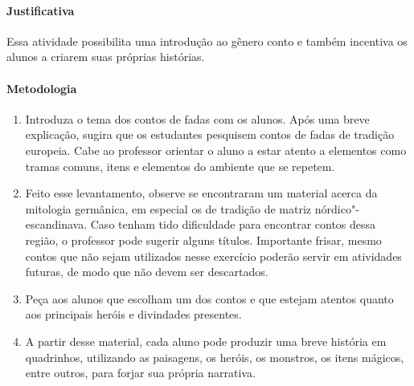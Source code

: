 \documentclass[12pt]{extarticle}
\begin{document}
\paragraph{Justificativa} Essa atividade possibilita uma introdução ao gênero conto e também incentiva os alunos a criarem suas próprias histórias.

\paragraph{Metodologia}

\begin{enumerate}

\item Introduza o tema dos contos de fadas com
os alunos. Após uma breve explicação, sugira que os estudantes pesquisem
contos de fadas de tradição europeia. Cabe ao professor orientar o aluno a estar atento a elementos
como tramas comuns, itens e elementos do ambiente que se repetem.

\item Feito esse levantamento, observe se encontraram um material acerca da mitologia germânica, em especial os de tradição de matriz
nórdico"-escandinava. Caso tenham tido dificuldade para encontrar contos
dessa região, o professor pode sugerir alguns títulos. Importante frisar, mesmo contos
que não sejam utilizados nesse exercício poderão servir em atividades
futuras, de modo que não devem ser descartados. 

\item Peça aos alunos que escolham um dos contos e que estejam atentos quanto aos
principais heróis e divindades presentes. 





\item  A partir desse material, cada aluno pode produzir uma breve história em
quadrinhos, utilizando as paisagens, os heróis, os monstros, os itens
mágicos, entre outros, para forjar sua própria narrativa.


\end{enumerate}


\end{document}
